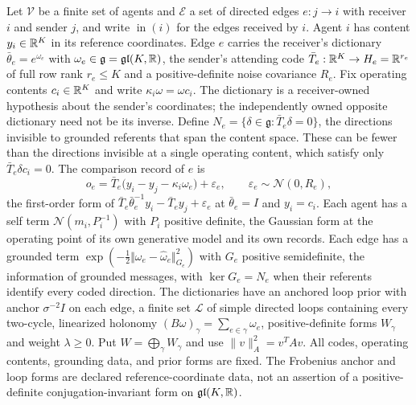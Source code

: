 \documentclass[11pt,letterpaper]{report}
\newcommand{\inn}{\operatorname{in}}
\begin{document}
Let $\mathcal V$ be a finite set of agents and $\mathcal E$ a set of directed edges $e:j\to i$ with receiver $i$ and sender $j$, and write $\inn(i)$ for the edges received by $i$. Agent $i$ has content $y_i\in\mathbb R^K$ in its reference coordinates. Edge $e$ carries the receiver's dictionary $\bar\theta_e=e^{\omega_e}$ with $\omega_e\in\mathfrak g=\mathfrak{gl}(K,\mathbb R)$, the sender's attending code $\bar T_e:\mathbb R^K\to H_e=\mathbb R^{r_e}$ of full row rank $r_e\leq K$ and a positive-definite noise covariance $R_e$. Fix operating contents $c_i\in\mathbb R^K$ and write $\kappa_i\omega=\omega c_i$. The dictionary is a receiver-owned hypothesis about the sender's coordinates; the independently owned opposite dictionary need not be its inverse. Define $N_e=\{\delta\in\mathfrak g:\bar T_e\delta=0\}$, the directions invisible to grounded referents that span the content space. These can be fewer than the directions invisible at a single operating content, which satisfy only $\bar T_e\delta c_i=0$. The comparison record of $e$ is
\begin{equation}
o_e=\bar T_e\bigl(y_i-y_j-\kappa_i\omega_e\bigr)+\varepsilon_e,\qquad\varepsilon_e\sim\mathcal N(0,R_e),
\label{it2:record}
\end{equation}
the first-order form of $\bar T_e\bar\theta_e^{-1}y_i-\bar T_ey_j+\varepsilon_e$ at $\bar\theta_e=I$ and $y_i=c_i$. Each agent has a self term $\mathcal N(m_i,P_i^{-1})$ with $P_i$ positive definite, the Gaussian form at the operating point of its own generative model and its own records. Each edge has a grounded term $\exp(-\frac12\Vert\omega_e-\hat\omega_e\Vert_{G_e}^2)$ with $G_e$ positive semidefinite, the information of grounded messages, with $\ker G_e=N_e$ when their referents identify every coded direction. The dictionaries have an anchored loop prior with anchor $\sigma^{-2}I$ on each edge, a finite set $\mathcal L$ of simple directed loops containing every two-cycle, linearized holonomy $(B\omega)_\gamma=\sum_{e\in\gamma}\omega_e$, positive-definite forms $W_\gamma$ and weight $\lambda\geq0$. Put $W=\bigoplus_\gamma W_\gamma$ and use $\|v\|_A^2=v^TAv$. All codes, operating contents, grounding data, and prior forms are fixed. The Frobenius anchor and loop forms are declared reference-coordinate data, not an assertion of a positive-definite conjugation-invariant form on $\mathfrak{gl}(K,\mathbb R)$.
\end{document}
